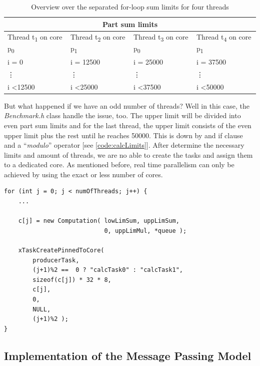 \renewcommand{\arraystretch}{1.5}

\begin{table}[h!]
	\centering
	\begin{tabular}{ | m{3cm} | m{3cm} | m{3cm} | m{3cm} |  }
		\hline
		\multicolumn{4}{|c|}{Part sum limits} \\
		\hline
			Thread t\textsubscript{1} on core p\textsubscript{0} & 
			Thread t\textsubscript{2} on core p\textsubscript{1} &
			Thread t\textsubscript{3} on core p\textsubscript{0} &
			Thread t\textsubscript{4} on core p\textsubscript{1} \\
		\hline
			i = 0 & i = 12500 & i = 25000 & i = 37500 \\
			\vdots & \vdots & \vdots & \vdots \\
			i \textless 12500 & i \textless 25000 & i \textless 37500 & i \textless 50000 \\
		\hline
	\end{tabular}
	\caption{ Overview over the separated for-loop sum limits for four threads }
	\label{table:partSumLimits}
\end{table}

But what happened if we have an odd number of threads? Well in this case, the \textit{Benchmark.h} class handle the issue, too. The upper limit will be divided into even part sum limits and for the last thread, the upper limit consists of the even upper limit plus the rest until he reaches 50000. This is down by and if clause and a ``\textit{modulo}'' operator [see \ref{code:calcLimits}]. After determine the necessary limits and amount of threads, we are no able to create the tasks and assign them to a dedicated core. As mentioned before, real time parallelism can only be achieved by using the exact or less number of cores. 

\begin{lstlisting}[label={code:createThreads}]
for (int j = 0; j < numOfThreads; j++) {
	...
	
	c[j] = new Computation(	lowLimSum, uppLimSum, 
							0, uppLimMul, *queue );

	xTaskCreatePinnedToCore(
		producerTask,
		(j+1)%2 ==  0 ? "calcTask0" : "calcTask1",
		sizeof(c[j]) * 32 * 8,
		c[j],
		0,
		NULL,
		(j+1)%2 );
}
\end{lstlisting}  

\newpage

\subsection{Implementation of the Message Passing Model}

